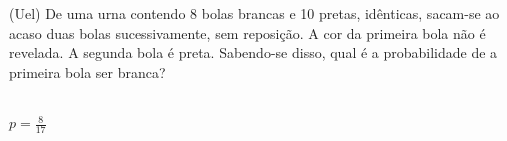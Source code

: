 \begin{ex}
(Uel) De uma urna contendo 8 bolas brancas e 10 pretas, idênticas, sacam-se ao acaso duas bolas sucessivamente, sem reposição. A cor da primeira bola não é revelada. A segunda bola é preta. Sabendo-se disso, qual é a probabilidade de a primeira bola ser branca?
  \begin{sol}
    \phantom{A} \\
    $p=\frac{8}{17}$
  \end{sol}
\end{ex}